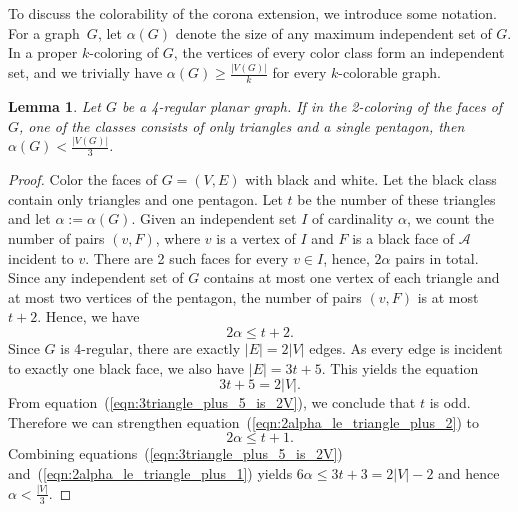 \documentclass[fontsize=11pt,a4paper,DIV12]{scrartcl}
\newtheorem{lemma}[theorem]{Lemma}
\begin{document}
\goodbreak

To discuss the colorability of the corona extension, we introduce some
notation.  For a graph~$G$, let $\alpha(G)$ denote the size of any maximum
independent set of $G$.  In a proper $k$-coloring of $G$, the vertices of
every color class form an independent set, and we trivially have
$\alpha(G) \geq \frac{|V(G)|}{k}$ for every $k$-colorable graph.

\begin{lemma}\label{theorem:alpha_lt_V3}
  Let $G$ be a 4-regular planar graph. If in the 2-coloring of the faces of
  $G$, one of the classes consists of only triangles and a single pentagon,
  then $\alpha(G)<\frac{|V(G)|}{3}$.
\end{lemma}

\begin{proof}
  Color the faces of $G=(V,E)$ with black and white. Let the black class
  contain only triangles and one pentagon. Let $t$ be the number of
  these triangles and let $\alpha:=\alpha(G)$.  Given an independent set $I$
  of cardinality $\alpha$, we count the number of pairs $(v,F)$, where $v$ is
  a vertex of $I$ and $F$ is a black face of $\mathcal{A}$ incident to
  $v$. There are 2 such faces for every $v\in I$, hence, $2\alpha$ pairs in
  total.  Since any independent set of $G$ contains at most one vertex of each
  triangle and at most two vertices of the pentagon, the number of pairs
  $(v,F)$ is at most $t + 2$. Hence, we have
  \begin{equation}
    \label{eqn:2alpha_le_triangle_plus_2}
    2\alpha\le t + 2.
  \end{equation}
  Since $G$ is 4-regular, there are exactly $|E|=2|V|$ edges.  As every edge
  is incident to exactly one black face, we also have $|E|=3 t + 5$.
  This yields the equation
  \begin{equation}
    \label{eqn:3triangle_plus_5_is_2V}
    3 t + 5 = 2|V|.
  \end{equation}
  From equation~(\ref{eqn:3triangle_plus_5_is_2V}), we conclude that
  $t$ is odd. Therefore we can strengthen
  equation~(\ref{eqn:2alpha_le_triangle_plus_2}) to
  \begin{equation}
    \label{eqn:2alpha_le_triangle_plus_1}
    2\alpha\le t + 1.
  \end{equation}
  Combining equations~(\ref{eqn:3triangle_plus_5_is_2V})
  and~(\ref{eqn:2alpha_le_triangle_plus_1}) yields
  $6\alpha\le 3 t + 3 = 2|V| -2 $ and hence $\alpha < \frac{|V|}{3}$.
\end{proof}
\end{document}
